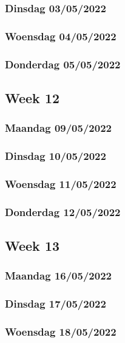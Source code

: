 \subsubsection{Dinsdag 03/05/2022}

\subsubsection{Woensdag 04/05/2022}

\subsubsection{Donderdag 05/05/2022}

\subsection{Week 12}

\subsubsection{Maandag 09/05/2022}

\subsubsection{Dinsdag 10/05/2022}

\subsubsection{Woensdag 11/05/2022}

\subsubsection{Donderdag 12/05/2022}

\subsection{Week 13}

\subsubsection{Maandag 16/05/2022}

\subsubsection{Dinsdag 17/05/2022}

\subsubsection{Woensdag 18/05/2022}

